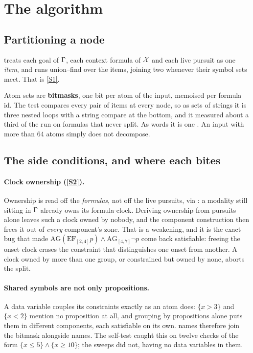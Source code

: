\section{The algorithm}
\label{sec:algorithm}

\subsection{Partitioning a node}

 treats each goal of $\Gamma$, each context formula of $\mathcal{X}$
and each live pursuit as one \emph{item}, and runs union--find over the items,
joining two whenever their symbol sets meet. That is \ref{S1}.

Atom sets are \textbf{bitmasks}, one bit per atom of the input, memoised per
formula id. The test compares every pair of items at every node, so as sets of
strings it is three nested loops with a string compare at the bottom, and it
measured about a third of the run on formulas that never split. As words it is
one \code{\&}. An input with more than $64$ atoms simply does not decompose.

\subsection{The side conditions, and where each bites}

\paragraph{Clock ownership (\ref{S2}).} Ownership is read off the
\emph{formulas}, not off the live pursuits, via : a modality
still sitting in $\Gamma$ already owns its formula-clock. Deriving ownership from
pursuits alone leaves such a clock owned by nobody, and the component
construction then frees it out of \emph{every} component's zone. That is a
weakening, and it is the exact bug that made
$\mathrm{AG}(\mathrm{EF}_{[2,4]}p)\wedge\mathrm{AG}_{[4,7]}\neg p$ come back
satisfiable: freeing the onset clock erases the constraint that distinguishes
one onset from another. A clock owned by more than one group, or constrained
but owned by none, aborts the split.

\paragraph{Shared symbols are not only propositions.} A data variable couples
its constraints exactly as an atom does: $\{x>3\}$ and $\{x<2\}$ mention no
proposition at all, and grouping by propositions alone puts them in different
components, each satisfiable on its own.  names therefore join the
bitmask alongside  names. The self-test caught this on twelve checks
of the form $\{x\le 5\}\wedge\{x\ge 10\}$; the sweeps did not, having no data
variables in them.

